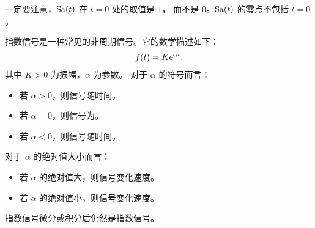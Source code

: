 \begin{note}
    一定要注意，$\mathrm{Sa}(t)$ 在 $t = 0$ 处的取值是 $1$，
    而不是 $0$。$\mathrm{Sa}(t)$ 的零点不包括 $t = 0$。
\end{note}

\begin{example}[指数信号]
    指数信号是一种常见的非周期信号。它的数学描述如下：
    \begin{align*}
        f(t) = K\mathrm{e}^{\alpha t}.
    \end{align*}
    其中 $K > 0$ 为振幅，$\alpha$ 为参数。
    对于 $\alpha$ 的符号而言：
    \begin{itemize}
        \item 若 $\alpha > 0$，则信号随时间。
        \item 若 $\alpha = 0$，则信号为。
        \item 若 $\alpha < 0$，则信号随时间。
    \end{itemize}
    对于 $\alpha$ 的绝对值大小而言：
    \begin{itemize}
        \item 若 $\alpha$ 的绝对值大，则信号变化速度。
        \item 若 $\alpha$ 的绝对值小，则信号变化速度。
    \end{itemize}
\end{example}

\begin{remark}
    指数信号微分或积分后仍然是指数信号。
\end{remark}
